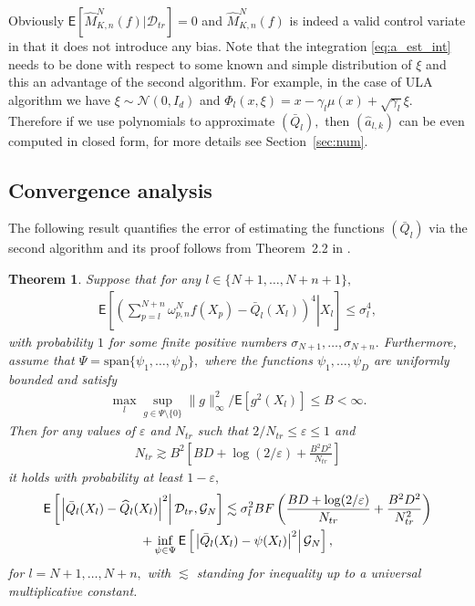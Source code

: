 \documentclass[article]{elsarticle}
\newtheorem{thm}{Theorem}
\begin{document}
Obviously \(\mathsf{E}[\widehat M_{K,n}^N(f)|\mathcal{D}_{tr}]=0\) and \(\widehat M_{K,n}^N(f)\) is indeed a valid control variate in that it
does not introduce any bias. Note that the integration \eqref{eq:a_est_int} needs to be done with respect to some known and simple distribution of \(\xi\) and this an advantage of the second algorithm.  For example, in the case of ULA algorithm we have \(\xi\sim \mathcal{N}(0,I_d)\) and \(\Phi_l(x,\xi)=x-\gamma_{l}\mu(x)+\sqrt{\gamma_{l}}\xi.\) Therefore if we use polynomials to approximate \((\bar Q_{l}),\) then \((\widehat a_{l,k})\) can be even computed in closed form, for more details see Section~\ref{sec:num}.
\subsection{Convergence analysis}
The following result quantifies the error of estimating the functions \((\bar Q_l)\)
via the second algorithm and its proof follows from Theorem~2.2 in \cite{audibert2011robust}.
\begin{thm}\label{berm:theorem:regression_cv}
 Suppose that for any \(l\in \{N+1,\ldots,N+n+1\},\)
\begin{eqnarray*}
\mathsf{E}\left[\left.\left(\sum_{p=l}^{N+n}\omega_{p,n}^{N}f(X_{p})-\bar Q_l(X_l)\right)^4\right | X_l\right]\leq \sigma_l^4,
\end{eqnarray*}
with probability \(1\) for some finite positive numbers \(\sigma_{N+1},\ldots, \sigma_{N+n}. \)
Furthermore, assume that \(\Psi=\mathrm{span}\{\psi_1,\ldots,\psi_D\},\) where the functions  \(\psi_1,\ldots,\psi_D\) are uniformly bounded and satisfy
\begin{eqnarray*}
\max_{l}\sup_{g\in \Psi\setminus \{0\}} \|g\|^2_\infty/\mathsf{E}[g^2(X_l)]\leq B<\infty.
\end{eqnarray*}
Then for any values of \(\varepsilon\) and \(N_{tr}\) such that \(2/N_{tr}\leq \varepsilon\leq 1\) and
\begin{eqnarray*}
N_{tr}\gtrsim B^2\left[BD+\log(2/\varepsilon)+\frac{B^2D^2}{N_{tr}}\right]
\end{eqnarray*}
it holds with probability at least \(1-\varepsilon,\)
\begin{multline}
\mathsf{E}\left[ \left.\Bigl|\bar Q_l(X_l)
-\widehat Q_l(X_l)\Bigr|^2\right | \mathcal{D}_{tr}, \mathcal{G}_N\right]
\lesssim  \sigma^2_l BF
\left(\frac{BD+\log(2/\varepsilon)}{N_{tr}}+\frac{B^2D^2}{N_{tr}^2}\right)
\\
 +
\inf_{\psi\in \Psi}
\mathsf{E}\left[\left.\left|\bar Q_l(X_{l})-\psi(X_{l})\right|^{2}\right | \mathcal{G}_N \right], \label{eq:regr_error}
\end{multline}
for \(l=N+1,\ldots,N+n,
\) with \(\lesssim\) standing for inequality up to a universal multiplicative constant.
\end{thm}
\end{document}

